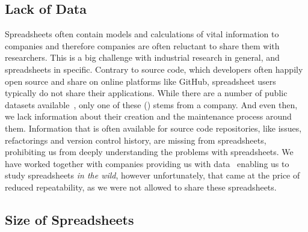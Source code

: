 \documentclass[conference]{IEEEtran}
\begin{document}
\subsection{Lack of Data}
Spreadsheets often contain models and calculations of vital information to companies and therefore companies are often reluctant to share them with researchers. This is a big challenge with industrial research in general, and spreadsheets in specific. Contrary to source code, which developers often happily open source and share on online platforms like GitHub, spreadsheet users typically do not share their applications. While there are a number of public datasets available~\cite{fisher_euses_2005, Hermans2015, conf/msr/BarikLSSM15}, only one of these (\cite{Hermans2015}) stems from a company. And even then, we lack information about their creation and the maintenance process around them. Information that is often available for source code repositories, like issues, refactorings and version control history, are missing from spreadsheets, prohibiting us from deeply understanding the problems with spreadsheets. We have worked together with companies providing us with data~\cite{hermans_supporting_2011, hermans_detecting_2012, hermans_detecting_2012-1, hermans_detecting_2014, Jansen2015} enabling us to study spreadsheets \emph{in the wild}, however unfortunately, that came at the price of reduced repeatability, as we were not allowed to share these spreadsheets.

\subsection{Size of Spreadsheets}
\end{document}
